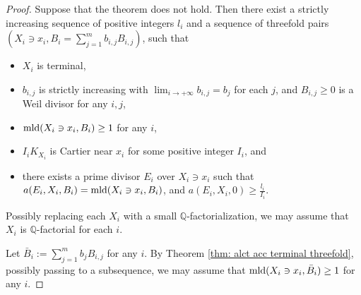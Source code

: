 \documentclass[11pt]{amsart}
\numberwithin{equation}{section}
\newcommand{\Qq}{\mathbb{Q}}
\newcommand{\mld}{{\rm{mld}}}
\theoremstyle{definition}
\theoremstyle{definition}
\begin{document}
\begin{proof}
Suppose that the theorem does not hold. Then there exist a strictly increasing sequence of positive integers $l_i$ and a sequence of threefold pairs $(X_i\ni x_i,B_i=\sum_{j=1}^mb_{i,j}B_{i,j})$, such that
\begin{itemize}
    \item $X_i$ is terminal,
    \item $b_{i,j}$ is strictly increasing with $\lim_{i\to +\infty} b_{i,j}=b_j$ for each $j$, and $B_{i,j}\geq 0$ is a Weil divisor for any $i,j$,
    \item $\mld(X_i\ni x_i,B_i)\ge 1$ for any $i$,
    \item $I_iK_{X_i}$ is Cartier near $x_i$ for some positive integer $I_i$, and
    \item there exists a prime divisor $E_i$ over $X_i\ni x_i$ such that $a(E_i,X_i,B_i)=\mld(X_i\ni x_i,B_i)$, and $a(E_i,X_i,0)\geq \frac{l_i}{I_i}$.
\end{itemize}
Possibly replacing each $X_i$ with a small $\Qq$-factorialization, we may assume that $X_i$ is $\Qq$-factorial for each $i$. 

Let $\bar B_i:=\sum_{j=1}^mb_jB_{i,j}$ for any $i$. By Theorem \ref{thm: alct acc terminal threefold}, possibly passing to a subsequence, we may assume that $\mld(X_i\ni x_i,\bar B_i)\ge 1$ for any $i$.  


\end{proof}
\end{document}
